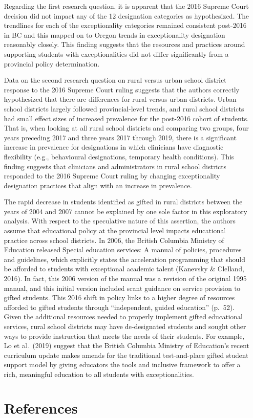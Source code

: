 \documentclass[
  english,
  man]{apa6}
\begin{document}
Regarding the first research question, it is apparent that the 2016 Supreme Court decision did not impact any of the 12 designation categories as hypothesized. The trendlines for each of the exceptionality categories remained consistent post-2016 in BC and this mapped on to Oregon trends in exceptionality designation reasonably closely. This finding suggests that the resources and practices around supporting students with exceptionalities did not differ significantly from a provincial policy determination.

Data on the second research question on rural versus urban school district response to the 2016 Supreme Court ruling suggests that the authors correctly hypothesized that there are differences for rural versus urban districts. Urban school districts largely followed provincial-level trends, and rural school districts had small effect sizes of increased prevalence for the post-2016 cohort of students. That is, when looking at all rural school districts and comparing two groups, four years preceding 2017 and three years 2017 through 2019, there is a significant increase in prevalence for designations in which clinicians have diagnostic flexibility (e.g., behavioural designations, temporary health conditions). This finding suggests that clinicians and administrators in rural school districts responded to the 2016 Supreme Court ruling by changing exceptionality designation practices that align with an increase in prevalence.

The rapid decrease in students identified as gifted in rural districts between the years of 2004 and 2007 cannot be explained by one sole factor in this exploratory analysis. With respect to the speculative nature of this assertion, the authors assume that educational policy at the provincial level impacts educational practice across school districts. In 2006, the British Columbia Ministry of Education released Special education services: A manual of policies, procedures and guidelines, which explicitly states the acceleration programming that should be afforded to students with exceptional academic talent (Kanevsky \& Clelland, 2016). In fact, this 2006 version of the manual was a revision of the original 1995 manual, and this initial version included scant guidance on service provision to gifted students. This 2016 shift in policy links to a higher degree of resources afforded to gifted students through \enquote{independent, guided education} (p.~52). Given the additional resources needed to properly implement gifted educational services, rural school districts may have de-designated students and sought other ways to provide instruction that meets the needs of their students. For example, Lo et al.~(2019) suggest that the British Columbia Ministry of Education's recent curriculum update makes amends for the traditional test-and-place gifted student support model by giving educators the tools and inclusive framework to offer a rich, meaningful education to all students with exceptionalities.

\newpage

\hypertarget{references}{%
\section{References}\label{references}}

\begingroup
\setlength{\parindent}{-0.5in}
\setlength{\leftskip}{0.5in}

\hypertarget{refs}{}

\endgroup
\end{document}
